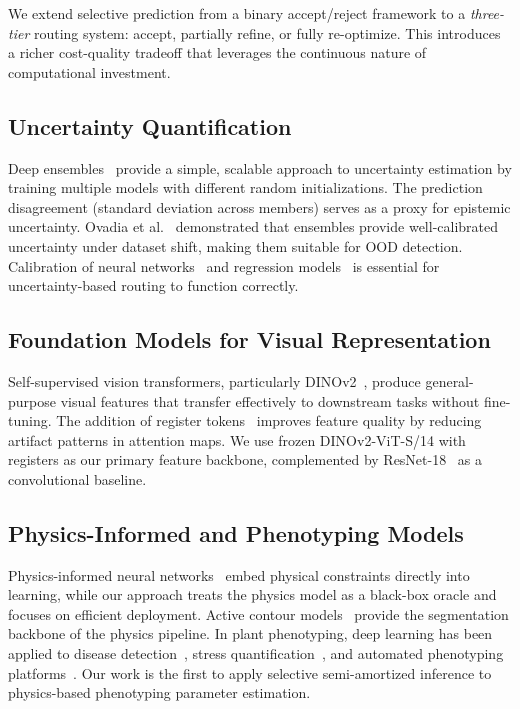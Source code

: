 \documentclass[11pt,a4paper]{article}
\begin{document}
We extend selective prediction from a binary accept/reject framework to a
\emph{three-tier} routing system: accept, partially refine, or fully re-optimize.
This introduces a richer cost-quality tradeoff that leverages the
continuous nature of computational investment.

\subsection{Uncertainty Quantification}

Deep ensembles~\cite{lakshminarayanan2017simple} provide a simple, scalable
approach to uncertainty estimation by training multiple models with different
random initializations. The prediction disagreement (standard deviation across
members) serves as a proxy for epistemic uncertainty.
Ovadia et al.~\cite{ovadia2019can} demonstrated that ensembles provide
well-calibrated uncertainty under dataset shift, making them suitable for
OOD detection. Calibration of neural networks~\cite{guo2017calibration}
and regression models~\cite{kuleshov2018accurate} is essential for
uncertainty-based routing to function correctly.

\subsection{Foundation Models for Visual Representation}

Self-supervised vision transformers, particularly DINOv2~\cite{oquab2024dinov2},
produce general-purpose visual features that transfer effectively to
downstream tasks without fine-tuning. The addition of register
tokens~\cite{darcet2024vision} improves feature quality by reducing
artifact patterns in attention maps. We use frozen DINOv2-ViT-S/14
with registers as our primary feature backbone, complemented by
ResNet-18~\cite{he2016deep} as a convolutional baseline.

\subsection{Physics-Informed and Phenotyping Models}

Physics-informed neural networks~\cite{raissi2019physics,karniadakis2021physics}
embed physical constraints directly into learning, while our approach treats
the physics model as a black-box oracle and focuses on efficient deployment.
Active contour models~\cite{kass1988snakes,chan2001active} provide the
segmentation backbone of the physics pipeline.
In plant phenotyping, deep learning has been applied to disease
detection~\cite{mutka2015image,mahlein2016plant},
stress quantification~\cite{singh2021plantdoc}, and automated
phenotyping platforms~\cite{ubbens2017deep,li2021review}.
Our work is the first to apply selective semi-amortized inference
to physics-based phenotyping parameter estimation.
\end{document}
